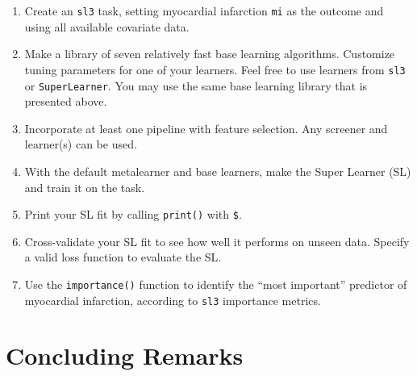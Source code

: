 \documentclass[
  12pt, krantz2,
]{book}
\newcommand{\passthrough}[1]{#1}
\providecommand{\tightlist}{%
  \setlength{\itemsep}{0pt}\setlength{\parskip}{0pt}}
\theoremstyle{definition}
\theoremstyle{definition}
\theoremstyle{definition}
\newcommand{\1}{\mathbbm{1}}
\begin{document}
\begin{enumerate}
\def\labelenumi{\arabic{enumi}.}
\tightlist
\item
  Create an \passthrough{\lstinline!sl3!} task, setting myocardial infarction \passthrough{\lstinline!mi!} as the outcome and
  using all available covariate data.
\item
  Make a library of seven relatively fast base learning algorithms. Customize
  tuning parameters for one of your learners. Feel free to use learners from
  \passthrough{\lstinline!sl3!} or \passthrough{\lstinline!SuperLearner!}. You may use the same base learning library that is
  presented above.
\item
  Incorporate at least one pipeline with feature selection. Any screener and
  learner(s) can be used.
\item
  With the default metalearner and base learners, make the Super Learner (SL)
  and train it on the task.
\item
  Print your SL fit by calling \passthrough{\lstinline!print()!} with \passthrough{\lstinline!$!}.
\item
  Cross-validate your SL fit to see how well it performs on unseen
  data. Specify a valid loss function to evaluate the SL.
\item
  Use the \passthrough{\lstinline!importance()!} function to identify the ``most important'' predictor of
  myocardial infarction, according to \passthrough{\lstinline!sl3!} importance metrics.
\end{enumerate}

\hypertarget{concluding-remarks}{%
\section{Concluding Remarks}\label{concluding-remarks}}
\end{document}
